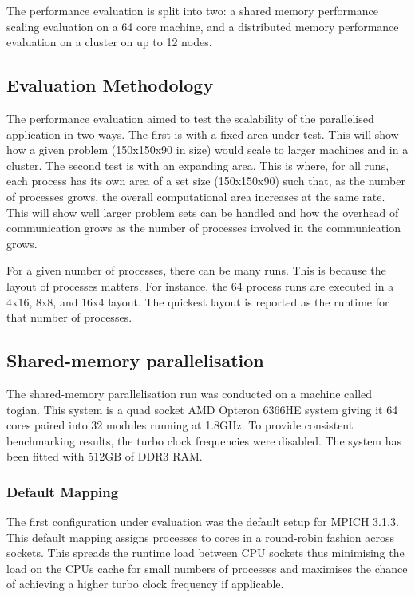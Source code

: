 The performance evaluation is split into two: a shared memory performance
scaling evaluation on a 64 core machine, and a distributed memory performance
evaluation on a cluster on up to 12 nodes.

\subsection{Evaluation Methodology}

The performance evaluation aimed to test the scalability of the parallelised
application in two ways. The first is with a fixed area under test. This will
show how a given problem (150x150x90 in size) would scale to larger machines and
in a cluster. The second test is with an expanding area. This is where, for all
runs, each process has its own area of a set size (150x150x90) such that, as the
number of processes grows, the overall computational area increases at the same
rate. This will show well larger problem sets can be handled and how the
overhead of communication grows as the number of processes involved in the
communication grows.

For a given number of processes, there can be many runs. This is because the
layout of processes matters. For instance, the 64 process runs are executed in a
4x16, 8x8, and 16x4 layout. The quickest layout is reported as the runtime for
that number of processes.

\subsection{Shared-memory parallelisation}

The shared-memory parallelisation run was conducted on a machine called togian.
This system is a quad socket AMD Opteron 6366HE system giving it 64 cores paired
into 32 modules running at 1.8GHz. To provide consistent benchmarking results,
the turbo clock frequencies were disabled. The system has been fitted with 512GB
of DDR3 RAM.

\subsubsection{Default Mapping}

The first configuration under evaluation was the default setup for MPICH 3.1.3.
This default mapping assigns processes to cores in a round-robin fashion across
sockets. This spreads the runtime load between CPU sockets thus minimising the
load on the CPUs cache for small numbers of processes and maximises the chance
of achieving a higher turbo clock frequency if applicable.

